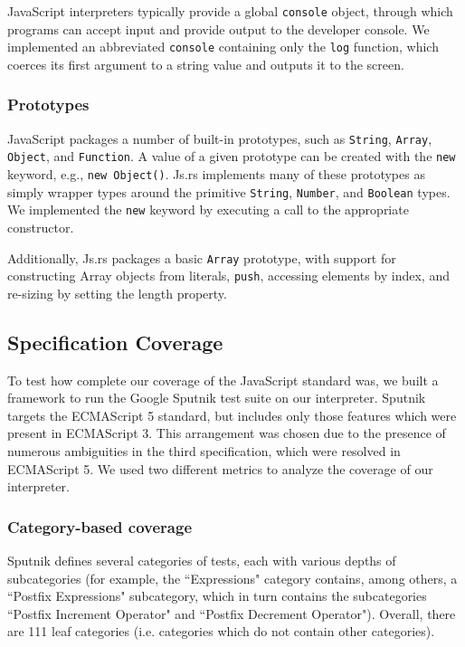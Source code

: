 \documentclass{article}
\begin{document}
\begin{multicols}{2}
JavaScript interpreters typically provide a global \texttt{console} object,
through which programs can accept input and provide output to the developer
console. We implemented an abbreviated \texttt{console} containing only the
\texttt{log} function, which coerces its first argument to a string value and
outputs it to the screen.

\subsubsection*{Prototypes}

JavaScript packages a number of built-in prototypes, such as \texttt{String},
\texttt{Array}, \texttt{Object}, and \texttt{Function}. A value of a given
prototype can be created with the \texttt{new} keyword, e.g., \texttt{new
Object()}. Js.rs implements many of these prototypes as simply wrapper types
around the primitive \texttt{String}, \texttt{Number}, and \texttt{Boolean}
types. We implemented the \texttt{new} keyword by executing a call to the
appropriate constructor. \newline

Additionally, Js.rs packages a basic \texttt{Array} prototype, with support for
constructing Array objects from literals, \texttt{push}, accessing elements by
index, and re-sizing by setting the length property.

\subsection{Specification Coverage}

To test how complete our coverage of the JavaScript standard was, we built a
framework to run the Google Sputnik test suite\cite{sputnik} on our interpreter.
Sputnik targets the ECMAScript 5 standard, but includes only those features
which were present in ECMAScript 3. This arrangement was chosen due to the
presence of numerous ambiguities in the third specification, which were resolved
in ECMAScript 5. We used two different metrics to analyze the coverage of our
interpreter.

\subsubsection*{Category-based coverage}

Sputnik defines several categories of tests, each with various depths of
subcategories (for example, the ``Expressions" category contains, among others,
a ``Postfix Expressions" subcategory, which in turn contains the subcategories
``Postfix Increment Operator" and ``Postfix Decrement Operator"). Overall, there
are 111 leaf categories (i.e. categories which do not contain other
categories). \newline


\end{multicols}
\end{document}
